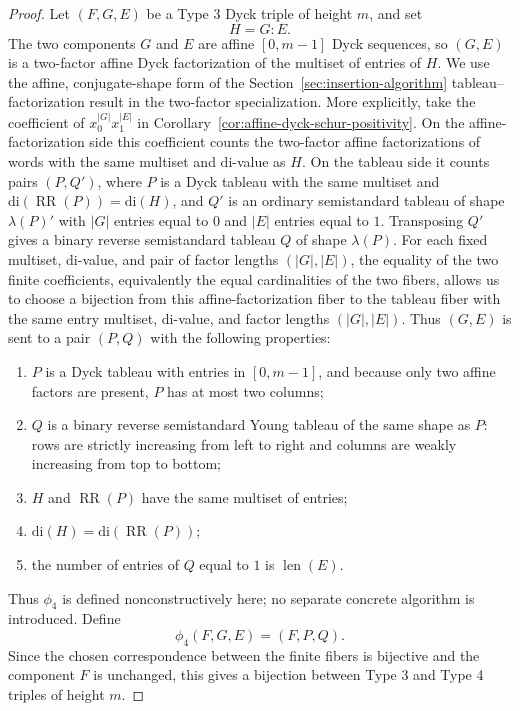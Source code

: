 \documentclass[11pt]{article}
\theoremstyle{plain}
\theoremstyle{definition}
\theoremstyle{remark}
\newcommand{\di}{\mathrm{di}}
\begin{document}
\begin{proof}
Let \((F,G,E)\) be a Type 3 Dyck triple of height \(m\), and set
\[
  H=G:E.
\]
The two components \(G\) and \(E\) are affine \([0,m-1]\) Dyck sequences,
so \((G,E)\) is a two-factor affine Dyck factorization of the multiset of
entries of \(H\).  We use the affine, conjugate-shape form of the
Section~\ref{sec:insertion-algorithm} tableau--factorization result in the
two-factor specialization.  More explicitly, take the coefficient of
\(x_0^{|G|}x_1^{|E|}\) in
Corollary~\ref{cor:affine-dyck-schur-positivity}.  On the affine-factorization
side this coefficient counts the two-factor affine factorizations of words with
the same multiset and \(\di\)-value as \(H\).  On the tableau side it counts
pairs \((P,Q')\), where \(P\) is a Dyck tableau with the same multiset and
\(\di(\operatorname{RR}(P))=\di(H)\), and \(Q'\) is an ordinary semistandard
tableau of shape \(\lambda(P)'\) with \(|G|\) entries equal to \(0\) and
\(|E|\) entries equal to \(1\).
Transposing \(Q'\) gives a binary
reverse semistandard tableau \(Q\) of shape \(\lambda(P)\).  For each fixed
multiset, \(\di\)-value, and pair of factor lengths \((|G|,|E|)\), the equality
of the two finite coefficients, equivalently the equal cardinalities of the two
fibers, allows us to choose a bijection from this
affine-factorization fiber to the tableau fiber with the same entry multiset,
\(\di\)-value, and factor lengths \((|G|,|E|)\).  Thus \((G,E)\) is sent to a
pair \((P,Q)\) with the following properties:
\begin{enumerate}[label=\textup{(\roman*)}]
\item \(P\) is a Dyck tableau with entries in \([0,m-1]\), and because only two
      affine factors are present, \(P\) has at most two columns;
\item \(Q\) is a binary reverse semistandard Young tableau of the same shape as
      \(P\): rows are strictly increasing from left to right and columns are
      weakly increasing from top to bottom;
\item \(H\) and \(\operatorname{RR}(P)\) have the same multiset of entries;
\item \(\di(H)=\di(\operatorname{RR}(P))\);
\item the number of entries of \(Q\) equal to \(1\) is \(\operatorname{len}(E)\).
\end{enumerate}
Thus \(\phi_4\) is defined nonconstructively here; no separate concrete
algorithm is introduced.  Define
\[
  \phi_4(F,G,E)=(F,P,Q).
\]
Since the chosen correspondence between the finite fibers is
bijective and the component \(F\) is unchanged, this gives a bijection between
Type 3 and Type 4 triples of height \(m\).


\end{proof}
\end{document}
